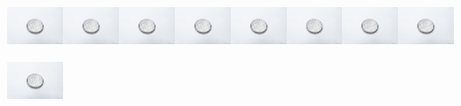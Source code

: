 \includegraphics[width=0.65539in,height=0.60039in]{media/image119.jpeg}\includegraphics[width=0.65539in,height=0.60039in]{media/image119.jpeg}\includegraphics[width=0.65539in,height=0.60039in]{media/image119.jpeg}\includegraphics[width=0.65539in,height=0.60039in]{media/image119.jpeg}\includegraphics[width=0.65539in,height=0.60039in]{media/image119.jpeg}\includegraphics[width=0.65539in,height=0.60039in]{media/image119.jpeg}\includegraphics[width=0.65539in,height=0.60039in]{media/image119.jpeg}\includegraphics[width=0.65539in,height=0.60039in]{media/image119.jpeg}\includegraphics[width=0.65539in,height=0.60039in]{media/image119.jpeg}

